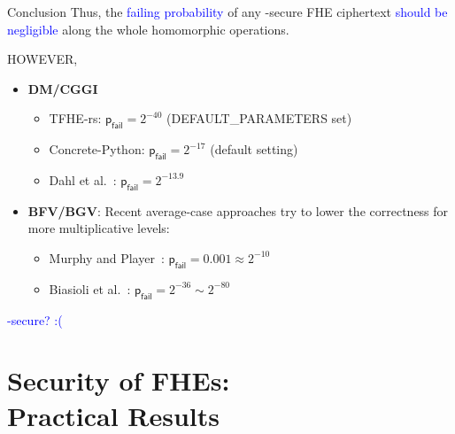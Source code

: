 \documentclass{beamer}
\begin{document}
	\begin{frame}{Conclusion}
    Thus, the \textcolor{blue}{failing probability} of any \indcpad-secure FHE ciphertext \textcolor{blue}{should be negligible} along the whole homomorphic operations. \vspace{0.1cm}\pause
    \begin{center}
        HOWEVER,
    \end{center}
    
    \begin{itemize}
        \item {\bf DM/CGGI}
            \begin{itemize}
                \item {TFHE-rs}: $\mathsf{p}_\mathsf{fail} =2^{-40}$ (DEFAULT\_PARAMETERS set)\pause
                \item {{Concrete-Python}}: $\mathsf{p}_\mathsf{fail} =2^{-17}$ (default setting)\pause
                \item {Dahl et al.~\cite{cryptoeprint:2023/815}}: $\mathsf{p}_\mathsf{fail} =2^{-13.9}$
            \end{itemize}\vspace{0.3cm}\pause
        \item {\bf BFV/BGV}: Recent average-case approaches try to lower the correctness for more multiplicative levels:\pause
            \begin{itemize}
                \item {Murphy and Player~\cite{EPRINT:MurPla19a}}: $\mathsf{p}_\mathsf{fail} =0.001 \approx 2^{-10}$\pause
                \item {Biasioli et al.~\cite{cryptoeprint:2023/600}}: $\mathsf{p}_\mathsf{fail} =2^{-36} \sim 2^{-80}$
            \end{itemize}
    \end{itemize}\vspace{0.3cm}\pause
    \begin{center}
        \textcolor{blue}{\indcpad-secure? :(}
    \end{center}
	\end{frame}

\section{\krd Security of FHEs:\\ {\normalsize Practical Results}}
\end{document}
